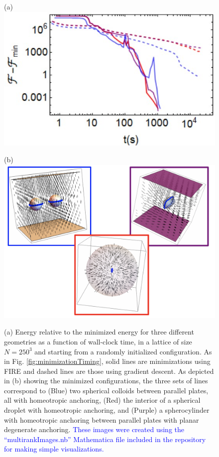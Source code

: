 \documentclass[utf8]{frontiersFPHY} %
\newcommand{\DMS}[1]{\textcolor{blue}{#1}}
\begin{document}
\begin{figure}[h!]
\begin{center}
\begin{minipage}{9cm}
(a) \\
\includegraphics[width=\textwidth]{Fig3AObjects.jpg}
\end{minipage}
\begin{minipage}{7.5cm}
(b) \\
\includegraphics[width=\textwidth]{Fig3BObjects.jpg}
\end{minipage}
\end{center}
\caption{(a) Energy relative to the minimized energy for three different geometries as a function of wall-clock time, in a lattice of size $N=250^3$ and starting from a randomly initialized configuration. As in Fig. \ref{fig:minimizationTiming}, solid lines are minimizations using FIRE  and dashed lines are those using gradient descent. As depicted in (b) showing the minimized configurations, the three sets of lines correspond to (Blue) two spherical colloids between parallel plates, all with homeotropic anchoring, (Red) the interior of a spherical droplet with homeotropic anchoring, and (Purple) a spherocylinder with homeotropic anchoring between parallel plates with planar degenerate anchoring. \DMS{These images were created using the ``multirankImages.nb'' Mathematica file included in the repository for making simple visualizations.}}\label{fig:objects}
\end{figure}
\end{document}

